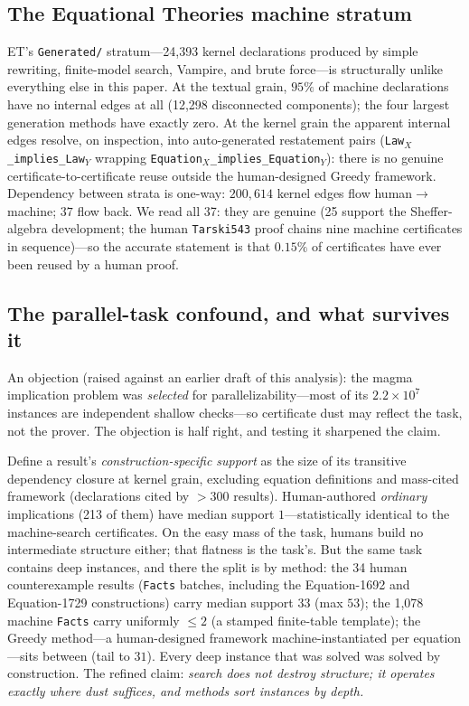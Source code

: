 \documentclass[11pt]{article}
\begin{document}
\subsection{The Equational Theories machine stratum}

ET's \texttt{Generated/} stratum---24{,}393 kernel declarations produced by simple rewriting,
finite-model search, Vampire, and brute force---is structurally unlike everything else in this
paper. At the textual grain, $95\%$ of machine declarations have no internal edges at all
(12{,}298 disconnected components); the four largest generation methods have exactly zero. At
the kernel grain the apparent internal edges resolve, on inspection, into auto-generated
restatement pairs (\texttt{Law$_X$\_implies\_Law$_Y$} wrapping
\texttt{Equation$_X$\_implies\_Equation$_Y$}): there is no genuine certificate-to-certificate
reuse outside the human-designed Greedy framework. Dependency between strata is one-way:
$200{,}614$ kernel edges flow human$\to$machine; $37$ flow back. We read all 37: they are
genuine (25 support the Sheffer-algebra development; the human \texttt{Tarski543} proof chains
nine machine certificates in sequence)---so the accurate statement is that $0.15\%$ of
certificates have ever been reused by a human proof.

\subsection{The parallel-task confound, and what survives it}
\label{sec:confound}

An objection (raised against an earlier draft of this analysis): the magma
implication problem was \emph{selected} for parallelizability---most of its $2.2\times10^{7}$
instances are independent shallow checks---so certificate dust may reflect the task, not the
prover. The objection is half right, and testing it sharpened the claim.

Define a result's \emph{construction-specific support} as the size of its transitive dependency
closure at kernel grain, excluding equation definitions and mass-cited framework (declarations
cited by $>300$ results). Human-authored \emph{ordinary} implications (213 of them) have median
support $1$---statistically identical to the machine-search certificates. On the easy mass of
the task, humans build no intermediate structure either; that flatness is the task's. But the
same task contains deep instances, and there the split is by method: the 34 human
counterexample results (\texttt{Facts} batches, including the Equation-1692 and Equation-1729
constructions) carry median support $33$ (max $53$); the 1{,}078 machine \texttt{Facts} carry
uniformly $\le 2$ (a stamped finite-table template); the Greedy method---a human-designed
framework machine-instantiated per equation---sits between (tail to $31$). Every deep instance
that was solved was solved by construction. The refined claim: \emph{search does not destroy
structure; it operates exactly where dust suffices, and methods sort instances by depth.}
\end{document}
